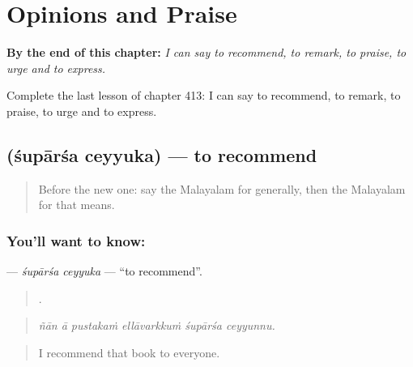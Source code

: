 
\chapter{Opinions and Praise}
\label{ch:ml-opinions-and-praise}

\begin{chapteropening}
\textbf{By the end of this chapter:} \emph{I can say to recommend, to remark, to praise, to urge and to express.}

Complete the last lesson of chapter 413: I can say to recommend, to remark, to praise, to urge and to express.
\end{chapteropening}

\section[\texorpdfstring{\ml{ശുപാർശ} \ml{ചെയ്യുക} (śupārśa ceyyuka)}{ശുപാർശ ചെയ്യുക (śupārśa ceyyuka)}]{  (śupārśa ceyyuka) — to recommend}

\label{lesson:ML-C413-suparsa-ceyyuka}



\begin{quote}
Before the new one: say the Malayalam for generally, then the Malayalam for that means.
\end{quote}

\subsection*{You'll want to know:  }
\textbf{ } — \emph{śupārśa ceyyuka} — \textquotedblleft{}to recommend\textquotedblright{}.

\begin{quote}
     .
\end{quote}

\begin{quote}
\emph{ñān ā pustakaṁ ellāvarkkuṁ śupārśa ceyyunnu.}
\end{quote}

\begin{quote}
I recommend that book to everyone.
\end{quote}

